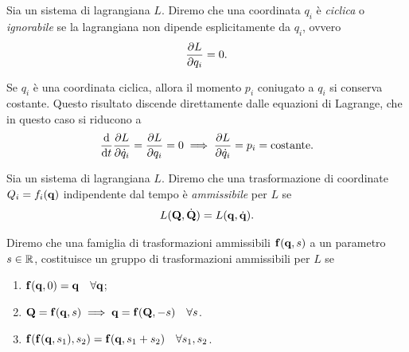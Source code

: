 \begin{definition}
    Sia un sistema di lagrangiana $L$. Diremo che una coordinata $q_i$ è \emph{ciclica} o \emph{ignorabile} se la lagrangiana non dipende esplicitamente da $q_i$, ovvero
    \begin{equation*}
        \pdv{L}{q_i} = 0.
    \end{equation*}
\end{definition}

\begin{remark}
    Se $q_i$ è una coordinata ciclica, allora il momento $p_i$ coniugato a $q_i$ si conserva costante. Questo risultato discende direttamente dalle equazioni di Lagrange, che in questo caso si riducono a
    \begin{equation*}
        \dv{t}\pdv{L}{\dot{q}_i} = \pdv{L}{q_i} = 0 \implies \pdv{L}{\dot{q}_i} = p_i = \text{costante}.
    \end{equation*}
\end{remark}

\begin{definition}
    Sia un sistema di lagrangiana $L$. Diremo che una trasformazione di coordinate $Q_i = f_i(\vb{q})$ indipendente dal tempo è \emph{ammissibile} per $L$ se
    \begin{equation*}
        L(\vb{Q}, \dot{\vb{Q}}) = L(\vb{q}, \dot{\vb{q}}).
    \end{equation*}
\end{definition}

\begin{definition}
    Diremo che una famiglia di trasformazioni ammissibili $\vb{f}(\vb{q}, s)$ a un parametro $s \in \mathbb{R}$, costituisce un gruppo di trasformazioni ammissibili per $L$ se
    \begin{enumerate}[label=($\roman*$)]
        \item $\vb{f}(\vb{q}, 0) = \vb{q} \quad \forall \vb{q}$;
        \item $\vb{Q} = \vb{f}(\vb{q}, s) \implies \vb{q} = \vb{f}(\vb{Q}, -s) \quad \forall s$.
        \item $\vb{f}(\vb{f}(\vb{q}, s_1), s_2) = \vb{f}(\vb{q}, s_1 + s_2) \quad \forall s_1, s_2$.
    \end{enumerate}
\end{definition}

